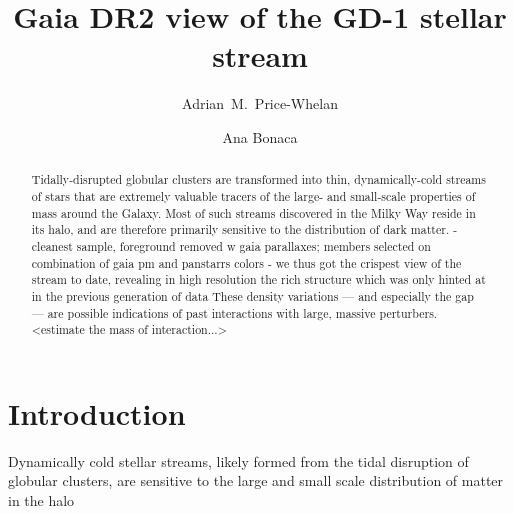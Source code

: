 \documentclass[modern]{aastex62}
\newcommand{\acronym}[1]{{\small{#1}}}
\newcommand{\gaia}{\textsl{Gaia}}
\newcommand{\pans}{\textsl{PanSTARRS}}
\newcommand{\DR}{\acronym{DR2}}
\begin{document}
\sloppy\sloppypar\raggedbottom\frenchspacing %

\title{Gaia DR2 view of the GD-1 stellar stream}

\author[0000-0003-0872-7098]{Adrian~M.~Price-Whelan}

\author[0000-0002-7846-9787]{Ana Bonaca}


\begin{abstract}\noindent %
Tidally-disrupted globular clusters are transformed into thin, dynamically-cold streams
of stars that are extremely valuable tracers of the large- and small-scale
properties of mass around the Galaxy.
Most of such streams discovered in the Milky Way reside in its halo, and are therefore primarily sensitive to the distribution of dark matter.
- cleanest sample, foreground removed w gaia parallaxes; members selected on combination of gaia pm and panstarrs colors
- we thus got the crispest view of the stream to date, revealing in high resolution the rich structure which was only hinted at in the previous generation of data
These density variations --- and especially the gap --- are possible indications
of past interactions with large, massive perturbers.
<estimate the mass of interaction...>
\end{abstract}


\section{Introduction}
\label{sec:intro}

Dynamically cold stellar streams, likely formed from the tidal disruption of globular clusters, are sensitive to the large and small scale distribution of matter in the halo
\end{document}
